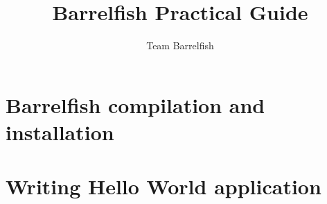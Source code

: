 \documentclass[a4paper,twoside]{report} %
\title{Barrelfish Practical Guide}   %
\author{Team Barrelfish}	%
\begin{document}
\maketitle

%
%
\begin{versionhistory}
\end{versionhistory}

\tableofcontents		%



\chapter{Barrelfish compilation and installation}\label{chap:compilationInstallation}


\chapter{Writing Hello World application}\label{chap:helloWorldApp}




\end{document}

